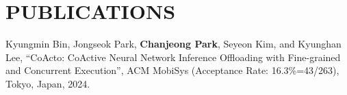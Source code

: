 \section*{PUBLICATIONS}

\noindent
Kyungmin Bin, Jongseok Park, \textbf{Chanjeong Park}, Seyeon Kim, and Kyunghan Lee, 
``CoActo: CoActive Neural Network Inference Offloading with Fine-grained and Concurrent Execution'',
ACM MobiSys (Acceptance Rate: 16.3\%=43/263), Tokyo, Japan, 2024.
